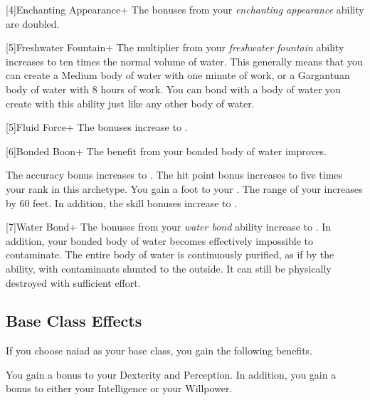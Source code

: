     [4]{Enchanting Appearance+} The bonuses from your \textit{enchanting appearance} ability are doubled.

    [5]{Freshwater Fountain+} The multiplier from your \textit{freshwater fountain} ability increases to ten times the normal volume of water.
    This generally means that you can create a Medium body of water with one minute of work, or a Gargantuan body of water with 8 hours of work.
    You can bond with a body of water you create with this ability just like any other body of water.

    [5]{Fluid Force+} The bonuses increase to .

    [6]{Bonded Boon+} The benefit from your bonded body of water improves.
    \begin{raggeditemize}
       The accuracy bonus increases to .
       The hit point bonus increases to five times your rank in this archetype.
       You gain a  foot  to your .
       The range of your  increases by 60 feet.
        In addition, the skill bonuses increase to .
    \end{raggeditemize}

    [7]{Water Bond+} The bonuses from your \textit{water bond} ability increase to .
    In addition, your bonded body of water becomes effectively impossible to contaminate.
    The entire body of water is continuously purified, as if by the  ability, with contaminants shunted to the outside.
    It can still be physically destroyed with sufficient effort.

  \subsection{Base Class Effects}
    If you choose naiad as your base class, you gain the following benefits.

      You gain a  bonus to your Dexterity and Perception. In addition, you gain a  bonus to either your Intelligence or your Willpower.

